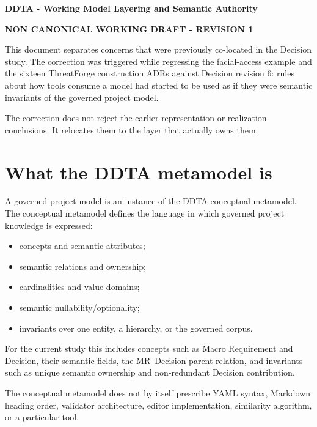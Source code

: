 \documentclass[11pt,a4paper]{article}
\begin{document}
{\LARGE\bfseries DDTA - Working Model Layering and Semantic Authority}\par
\vspace{4pt}
{\large\bfseries NON CANONICAL WORKING DRAFT - REVISION 1}\par
\vspace{4pt}
This document separates concerns that were previously co-located in the Decision study. The correction was triggered while regressing the facial-access example and the sixteen ThreatForge construction ADRs against Decision revision 6: rules about how tools consume a model had started to be used as if they were semantic invariants of the governed project model.

The correction does not reject the earlier representation or realization conclusions. It relocates them to the layer that actually owns them.

\section{What the DDTA metamodel is}
A governed project model is an instance of the DDTA conceptual metamodel. The conceptual metamodel defines the language in which governed project knowledge is expressed:
\begin{itemize}
\item concepts and semantic attributes;
\item semantic relations and ownership;
\item cardinalities and value domains;
\item semantic nullability/optionality;
\item invariants over one entity, a hierarchy, or the governed corpus.
\end{itemize}
For the current study this includes concepts such as Macro Requirement and Decision, their semantic fields, the MR--Decision parent relation, and invariants such as unique semantic ownership and non-redundant Decision contribution.

The conceptual metamodel does not by itself prescribe YAML syntax, Markdown heading order, validator architecture, editor implementation, similarity algorithm, or a particular tool.
\end{document}
